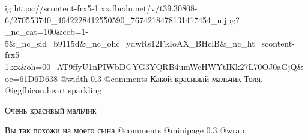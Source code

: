  
 
 
 
 

\ifcmt
  ig https://scontent-frx5-1.xx.fbcdn.net/v/t39.30808-6/270553740_4642228412550590_7674218478131417454_n.jpg?_nc_cat=100&ccb=1-5&_nc_sid=b9115d&_nc_ohc=ydwRs12FkIoAX_BHclB&_nc_ht=scontent-frx5-1.xx&oh=00_AT9ffyU1nPIWbDGYG3YQRB4umWcHWYtIKk27L70OJ0aGjQ&oe=61D6D638
  @width 0.3
  @comments%
		Какой красивый мальчик Толя. @igg{fbicon.heart.sparkling} 
		
		Очень красивый мальчик

    Вы так похожи на моего сына
  @comments%
  @minipage 0.3
  @wrap \parpic[r]
\fi


